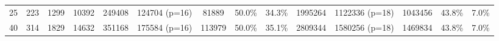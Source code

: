 \begin{table*}
\begin{tabular}{lccc|lcccl|lcccl}
    25 & 223 & 1299 & 10392 & 249408 & 124704 (p=16) & 81889 & 50.0\%& 34.3\%& 1995264 & 1122336 (p=18)& 1043456 & 43.8\%& 7.0\% \\
    
    40 & 314 & 1829& 14632\;& 351168\:& 175584 (p=16)& 113979& 50.0\%& 35.1\%& 2809344\;& 1580256 (p=18)& 1469834& 43.8\%& 7.0\% \\
    
    \bottomrule
  \end{tabular}
\end{table*}